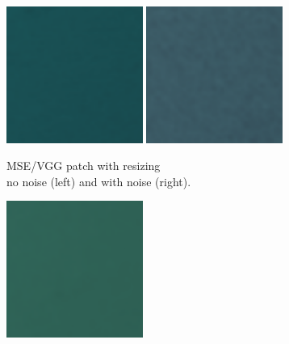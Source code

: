 \begin{figure}[ht]
    \begin{subfigure}[b]{0.49\textwidth}
        \centering
        \includegraphics[width=0.49\textwidth]{figures/mse-vgg-no-noise-resize-patch-single.png}
        \includegraphics[width=0.49\textwidth]{figures/mse-vgg-noise-resize-patch-single.png}
        \captionsetup{justification=centering}
        \caption{MSE/VGG patch with resizing \\ no noise (left) and with noise (right).} 
    \end{subfigure}
    \hfill
    \begin{subfigure}[b]{0.49\textwidth}
        \centering
        \includegraphics[width=0.49\textwidth]{figures/mse-no-noise-resize-patch-single.png}

\end{subfigure}
\end{figure}
